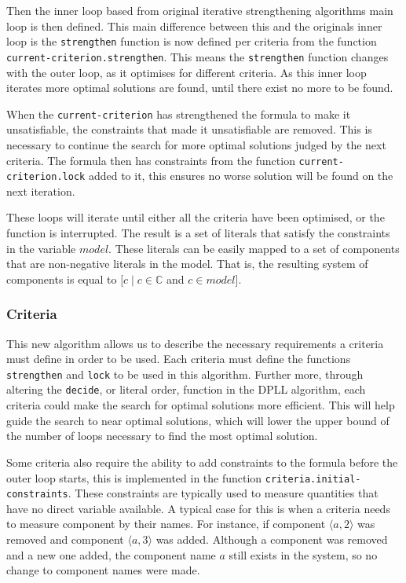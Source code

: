 Then the inner loop based from original iterative strengthening algorithms main loop is then defined.
This main difference between this and the originals inner loop is the \verb+strengthen+ function is now defined per criteria from the function \verb+current-criterion.strengthen+.
This means the \verb+strengthen+ function changes with the outer loop, as it optimises for different criteria.
As this inner loop iterates more optimal solutions are found, until there exist no more to be found.

When the \verb+current-criterion+ has strengthened the formula to make it unsatisfiable, the constraints that made it unsatisfiable are removed.
This is necessary to continue the search for more optimal solutions judged by the next criteria.
The formula then has constraints from the function \verb+current-criterion.lock+ added to it, this ensures no worse solution will be found on the next iteration.

These loops will iterate until either all the criteria have been optimised, or the function is interrupted.
The result is a set of literals that satisfy the constraints in the variable $model$.
These literals can be easily mapped to a set of components that are non-negative literals in the model.
That is, the resulting system of components is equal to $[c \mid c \in \mathbb{C}$ and $c \in model]$.

\subsubsection{Criteria}
This new algorithm allows us to describe the necessary requirements a criteria must define in order to be used.
Each criteria must define the functions \verb+strengthen+ and \verb+lock+ to be used in this algorithm.
Further more, through altering the \verb+decide+, or literal order, function in the DPLL algorithm, each criteria could make the search for optimal solutions more efficient.
This will help guide the search to near optimal solutions, which will lower the upper bound of the number of loops necessary to find the most optimal solution.

Some criteria also require the ability to add constraints to the formula before the outer loop starts,
this is implemented in the function \verb+criteria.initial-constraints+.
These constraints are typically used to measure quantities that have no direct variable available.
A typical case for this is when a criteria needs to measure component by their names.
For instance, if component $\langle a,2\rangle$ was removed and component $\langle a,3 \rangle$ was added. 
Although a component was removed and a new one added, the component name $a$ still exists in the system, so no change to component names were made.

